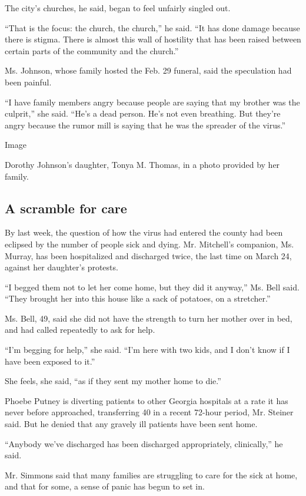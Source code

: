 The city's churches, he said, began to feel unfairly singled out.

``That is the focus: the church, the church,'' he said. ``It has done
damage because there is stigma. There is almost this wall of hostility
that has been raised between certain parts of the community and the
church.''

Ms. Johnson, whose family hosted the Feb. 29 funeral, said the
speculation had been painful.

``I have family members angry because people are saying that my brother
was the culprit,'' she said. ``He's a dead person. He's not even
breathing. But they're angry because the rumor mill is saying that he
was the spreader of the virus.''

Image

Dorothy Johnson's daughter, Tonya M. Thomas, in a photo provided by her
family.

\hypertarget{a-scramble-for-care}{%
\subsection{A scramble for care}\label{a-scramble-for-care}}

By last week, the question of how the virus had entered the county had
been eclipsed by the number of people sick and dying. Mr. Mitchell's
companion, Ms. Murray, has been hospitalized and discharged twice, the
last time on March 24, against her daughter's protests.

``I begged them not to let her come home, but they did it anyway,'' Ms.
Bell said. ``They brought her into this house like a sack of potatoes,
on a stretcher.''

Ms. Bell, 49, said she did not have the strength to turn her mother over
in bed, and had called repeatedly to ask for help.

``I'm begging for help,'' she said. ``I'm here with two kids, and I
don't know if I have been exposed to it.''

She feels, she said, ``as if they sent my mother home to die.''

Phoebe Putney is diverting patients to other Georgia hospitals at a rate
it has never before approached, transferring 40 in a recent 72-hour
period, Mr. Steiner said. But he denied that any gravely ill patients
have been sent home.

``Anybody we've discharged has been discharged appropriately,
clinically,'' he said.

Mr. Simmons said that many families are struggling to care for the sick
at home, and that for some, a sense of panic has begun to set in.

